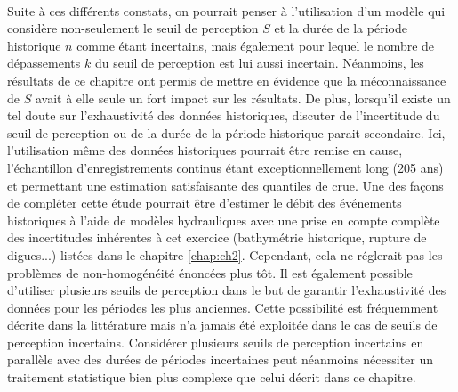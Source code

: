 	\paragraph{} Suite à ces différents constats, on pourrait penser à l'utilisation d'un modèle qui considère non-seulement le seuil de perception $S$ et la durée de la période historique $n$ comme étant incertains, mais également pour lequel le nombre de dépassements $k$ du seuil de perception est lui aussi incertain. Néanmoins, les résultats de ce chapitre ont permis de mettre en évidence que la méconnaissance de $S$ avait à elle seule un fort impact sur les résultats. De plus, lorsqu'il existe un tel doute sur l'exhaustivité des données historiques, discuter de l'incertitude du seuil de perception ou de la durée de la période historique parait secondaire. Ici, l'utilisation même des données historiques pourrait être remise en cause, l'échantillon d'enregistrements continus étant exceptionnellement long (205 ans) et permettant une estimation satisfaisante des quantiles de crue. Une des façons de compléter cette étude pourrait être d'estimer le débit des événements historiques à l'aide de modèles hydrauliques avec une prise en compte complète des incertitudes inhérentes à cet exercice (bathymétrie historique, rupture de digues...) listées dans le chapitre \ref{chap:ch2}. Cependant, cela ne réglerait pas les problèmes de non-homogénéité énoncées plus tôt. Il est également possible d'utiliser plusieurs seuils de perception dans le but de garantir l'exhaustivité des données pour les périodes les plus anciennes. Cette possibilité est fréquemment décrite dans la littérature mais n'a jamais été exploitée dans le cas de seuils de perception incertains. Considérer plusieurs seuils de perception incertains en parallèle avec des durées de périodes incertaines peut néanmoins nécessiter un traitement statistique bien plus complexe que celui décrit dans ce chapitre.
	
